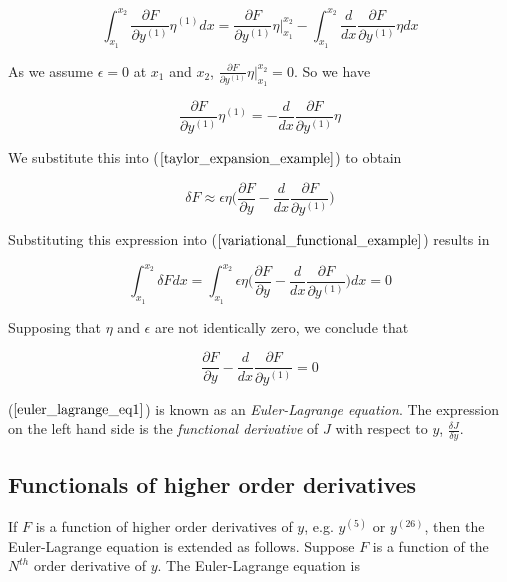 \documentclass[]{article}
\begin{document}
\begin{equation*} \int_{x_{1}}^{x_{2}} \frac{\partial F}{\partial y^{(1)}}\eta^{(1)}dx = \frac{\partial F}{\partial y^{(1)}}\eta \bigg|_{x_1}^{x_{2}} - \int_{x_{1}}^{x_{2}} \frac{d}{dx}\frac{\partial F}{\partial y^{(1)}}\eta dx\end{equation*}

As we assume $\epsilon =0$ at $x_{1}$ and $x_{2}$, $\frac{\partial F}{\partial y^{(1)}}\eta \bigg|_{x_1}^{x_{2}} = 0$. So we have

\begin{equation*} \frac{\partial F}{\partial y^{(1)}}\eta^{(1)} = - \frac{d}{dx}\frac{\partial F}{\partial y^{(1)}}\eta \end{equation*}

We substitute this into ($\ref{taylor_expansion_example}$) to obtain

\begin{equation*} \delta F \approx \epsilon \eta \bigg(\frac{\partial F}{\partial y} - \frac{d}{dx}\frac{\partial F}{\partial y^{(1)}}\bigg) \label{simplified_taylor_expansion} \end{equation*}

Substituting this expression into ($\ref{variational_functional_example}$) results in

\begin{equation*} \int_{x_{1}}^{x_{2}} \delta F dx = \int_{x_{1}}^{x_{2}} \epsilon \eta \bigg(\frac{\partial F}{\partial y} - \frac{d}{dx}\frac{\partial F}{\partial y^{(1)}}\bigg) dx = 0 \label{variational_eta_final} \end{equation*}

Supposing that $\eta$ and $\epsilon$ are not identically zero, we conclude that 

\begin{equation} \frac{\partial F}{\partial y} - \frac{d}{dx}\frac{\partial F}{\partial y^{(1)}} = 0 \label{euler_lagrange_eq1} \end{equation}

($\ref{euler_lagrange_eq1}$) is known as an \textit{Euler-Lagrange equation}. The expression on the left hand side is the \textit{functional derivative} of $J$ with respect to $y$, $\frac{\delta J}{\delta y}$.

\subsection{Functionals of higher order derivatives}
If $F$ is a function of higher order derivatives of $y$, e.g. $y^{(5)}$ or $y^{(26)}$, then the Euler-Lagrange equation is extended as follows. Suppose $F$ is a function of the $N^{th}$ order derivative of $y$. The Euler-Lagrange equation is
\end{document}

